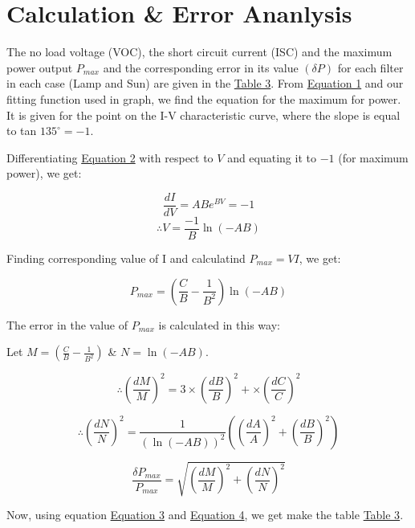 \section{Calculation \& Error Ananlysis}
	The no load voltage (VOC), the short circuit current (ISC) and the maximum power output $P_{max}$ and the corresponding error in its value $(\delta P)$ for each filter in each case (Lamp and Sun) are given in the \hyperref[tab:3]{Table 3}. From \hyperref[eq:1]{Equation 1} and our fitting function used in graph, we find the equation for the maximum for power. It is given for the point on the I-V characteristic curve, where the slope is equal to tan $135^\circ = -1$.

	Differentiating \hyperref[eq:2]{Equation 2} with respect to $V$ and equating it to $-1$ (for maximum power), we get:

	$$\frac{dI}{dV} = ABe^{BV} = -1$$
	$$\therefore V = \frac{-1}{B}\ln\left(-AB\right)$$

	Finding corresponding value of I and calculatind $P_{max} = VI$, we get:

	\begin{equation}
		P_{max} = \left(\frac{C}{B} - \frac{1}{B^2}\right)\ln\left(-AB\right)
		\label{eq:3}
	\end{equation}

	The error in the value of $P_{max}$ is calculated in this way:

	Let $M = \left(\frac{C}{B} - \frac{1}{B^2}\right)$ \& $N = \ln\left(-AB\right)$.

	$$\therefore \left(\frac{dM}{M}\right)^2 = 3\times\left(\frac{dB}{B}\right)^2 + \times\left(\frac{dC}{C}\right)^2$$

	$$\therefore \left(\frac{dN}{N}\right)^2 = \frac{1}{(\ln(-AB))^2}\left(\left(\frac{dA}{A}\right)^2 + \left(\frac{dB}{B}\right)^2\right)$$

	\begin{equation}
		\frac{\delta P_{max}}{P_{max}} = \sqrt{\left(\frac{dM}{M}\right)^2 + \left(\frac{dN}{N}\right)^2}
		\label{eq:4}
	\end{equation}

	Now, using equation \hyperref[eq:3]{Equation 3} and \hyperref[eq:4]{Equation 4}, we get make the table \hyperref[tab:3]{Table 3}.

	
